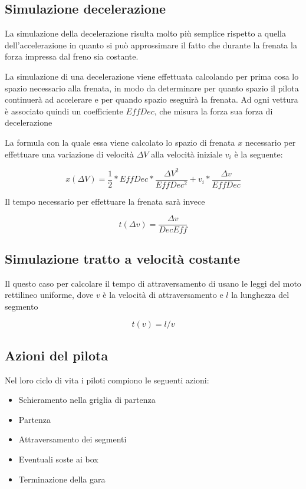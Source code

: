 \documentclass[a4paper,11pt, twoside]{book}
\begin{document}
      \subsection{Simulazione decelerazione}
	La simulazione della decelerazione risulta molto più semplice rispetto a quella dell'accelerazione in quanto
	si può approssimare il fatto che durante la frenata la forza impressa dal freno sia costante.
	
        La simulazione di una decelerazione viene effettuata calcolando per prima cosa lo spazio necessario alla frenata,
	in modo da determinare per quanto spazio il pilota continuerà ad accelerare e per quando spazio 
	eseguirà la frenata. Ad ogni vettura è associato quindi
	un coefficiente $EffDec$, che misura la forza sua forza di decelerazione
	
	La formula con la quale essa viene calcolato lo spazio di frenata $x$ necessario per effettuare una variazione 
	di velocità $\Delta V$ alla velocità iniziale $v_i$ è la seguente:
	
	$$x(\Delta V)=\frac{1}{2}*EffDec*\frac{\Delta V^2}{EffDec^2}+v_i*\frac{\Delta v}{EffDec}$$
	
	Il tempo necessario per effettuare la frenata sarà invece
	
	$$t(\Delta v) = \frac{\Delta v}{DecEff}$$

		
      \subsection{Simulazione tratto a velocità costante}
        
        Il questo caso per calcolare il tempo di attraversamento di usano le leggi del moto rettilineo uniforme,
	dove $v$ è la velocità di attraversamento e $l$ la lunghezza del segmento
	
	$$t(v)=l/v$$
	
      \subsection{Azioni del pilota}
        Nel loro ciclo di vita i piloti compiono le seguenti azioni:
	
	\begin{itemize}
	  \item Schieramento nella griglia di partenza
	  \item Partenza
	  \item Attraversamento dei segmenti
	  \item Eventuali soste ai box
	  \item Terminazione della gara
	\end{itemize}
\end{document}
